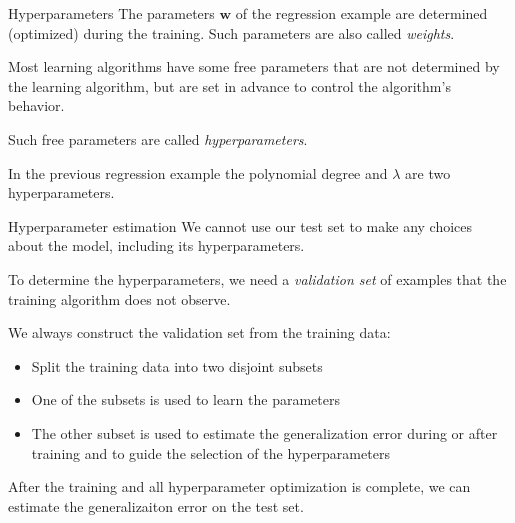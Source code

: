 \documentclass[dvipsnames]{beamer}
\begin{document}
\begin{frame}{Hyperparameters}
	The parameters $\mathbf{w}$ of the regression example are determined (optimized) during the training. Such parameters are also called \emph{weights}. \pause
	
	Most learning algorithms have some free parameters that are not determined by the learning algorithm, but are set in advance to control the algorithm's behavior. \pause

	Such free parameters are called \emph{hyperparameters}.

\pause
	In the previous regression example the polynomial degree and $\lambda$ are two hyperparameters.

\end{frame}

		
		\begin{frame}{Hyperparameter estimation}
			We cannot use our test set to make any choices about the model, including its hyperparameters. \pause
			
			To determine the hyperparameters, we need a \emph{validation set} of examples that the training algorithm does not observe. \pause
			
			We always construct the validation set from the training data:
			\begin{itemize}
				\item Split the training data into two disjoint subsets \pause
				\item One of the subsets is used to learn the parameters \pause
				\item The other subset is used to estimate the generalization error during or after training and to guide the selection of the hyperparameters \pause
			\end{itemize}
			
			After the training and all hyperparameter optimization is complete, we can estimate the generalizaiton error on the test set.
    \end{frame}
		
\end{document}
